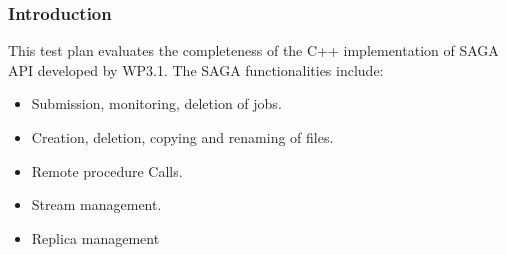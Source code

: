 


\subsubsection{Introduction}

This test plan evaluates the completeness of the C++ implementation of
SAGA API developed
by WP3.1. The SAGA functionalities include:

\begin{itemize}

	\item Submission, monitoring, deletion of jobs.

	\item Creation, deletion, copying and renaming of files.

	\item Remote procedure Calls.

	\item Stream management.

	\item  Replica management
\end{itemize}


